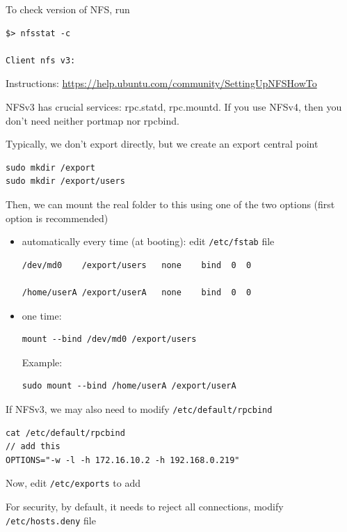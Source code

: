 To check version of NFS, run 
\begin{verbatim}
$> nfsstat -c

Client nfs v3:

\end{verbatim}
Instructions: \url{https://help.ubuntu.com/community/SettingUpNFSHowTo}

NFSv3 has crucial services: rpc.statd, rpc.mountd. If you use NFSv4,
then you don't need neither portmap nor rpcbind. 

Typically, we don't export directly, but we create an export central point
\begin{verbatim}
sudo mkdir /export
sudo mkdir /export/users 
\end{verbatim}

Then, we can mount the real folder to this using one of the two options (first
option is recommended)
\begin{itemize}
   \item automatically every time (at booting): edit \verb!/etc/fstab! file
\begin{verbatim}
/dev/md0    /export/users   none    bind  0  0

/home/userA /export/userA   none    bind  0  0

\end{verbatim}

  \item one time: 
\begin{verbatim}
mount --bind /dev/md0 /export/users
\end{verbatim}

Example:
\begin{verbatim}
sudo mount --bind /home/userA /export/userA 
\end{verbatim}

\end{itemize}


If NFSv3, we may also need to modify \verb!/etc/default/rpcbind!
\begin{verbatim}
cat /etc/default/rpcbind 
// add this
OPTIONS="-w -l -h 172.16.10.2 -h 192.168.0.219"
\end{verbatim}

Now, edit \verb!/etc/exports! to add


For security, by default, it needs to reject all connections, modify
\verb!/etc/hosts.deny! file

